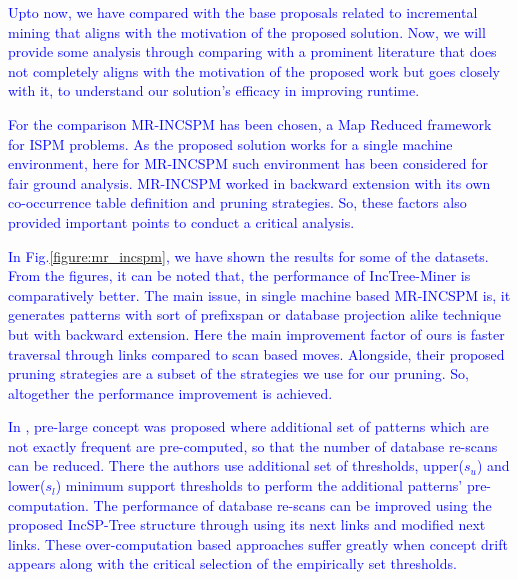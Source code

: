 \textcolor{blue}{Upto now, we have compared with the base proposals related to incremental mining that aligns with the motivation of the proposed solution. Now, we will provide some analysis through comparing with a prominent literature that does not completely aligns with the motivation of the proposed work but goes closely with it, to understand our solution's efficacy in improving runtime.}

\textcolor{blue}{For the comparison MR-INCSPM\cite{saleti2019mapreduce} has been chosen, a Map Reduced framework for ISPM problems. As the proposed solution works for a single machine environment, here for MR-INCSPM such environment has been considered for fair ground analysis. MR-INCSPM worked in backward extension with its own co-occurrence table definition and pruning strategies. So, these factors also provided important points to conduct a critical analysis.}

\textcolor{blue}{In Fig.\ref{figure:mr_incspm}, we have shown the results for some of the datasets. From the figures, it can be noted that, the performance of IncTree-Miner is comparatively better. The main issue, in single machine based MR-INCSPM is, it generates patterns with sort of prefixspan or database projection alike technique but with backward extension. Here the main improvement factor of ours is faster traversal through links compared to scan based moves. Alongside, their proposed pruning strategies are a subset of the strategies we use for our pruning. So, altogether the performance improvement is achieved.}

\textcolor{blue}{In \cite{lin2015incrementally}, pre-large concept was proposed where additional set of patterns which are not exactly frequent are pre-computed, so that the number of database re-scans can be reduced. There the authors use additional set of thresholds, upper($s_{u}$) and lower($s_{l}$) minimum support thresholds to perform the additional patterns' pre-computation. The performance of database re-scans can be improved using the proposed IncSP-Tree structure through using its next links and modified next links. These over-computation based approaches suffer greatly when concept drift appears along with the critical selection of the empirically set thresholds.}

